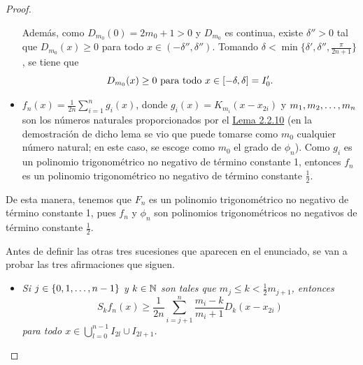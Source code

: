 \documentclass[a4paper, 12pt, oneside]{book}
\begin{document}
\begin{proof}
\begin{itemize}
        Además, como $D_{m_0}(0) = 2m_0+1 > 0$ y $D_{m_0}$ es continua, existe $\delta'' > 0$ tal que $D_{m_0}(x) \geq 0$ para todo $x \in (-\delta'',\delta'')$. Tomando $\delta < \min\{\delta',\delta'',\frac{\pi}{2n+1}\}$, se tiene que
        \begin{equation}\label{2.2.15}
            D_{m_0}(x) \geq 0 \textup{ para todo } x \in [-\delta,\delta] = I_0'.
        \end{equation}
        \item $f_n(x) = \frac{1}{2n}\sum_{i=1}^n g_i(x)$, donde $g_i(x)= K_{m_i}(x-x_{2i})$ y $m_1,m_2,\mathellipsis,m_n$ son los números naturales proporcionados por el \hyperref[2.2.10]{\color{blue}Lema 2.2.10} (en la demostración de dicho lema se vio que puede tomarse como $m_0$ cualquier número natural; en este caso, se escoge como $m_0$ el grado de $\phi_n$). Como $g_i$ es un polinomio trigonométrico no negativo de término constante 1, entonces $f_n$ es un polinomio trigonométrico no negativo de término constante $\frac{1}{2}$.
    \end{itemize}

    De esta manera, tenemos que $F_n$ es un polinomio trigonométrico no negativo de término constante 1, pues $f_n$ y $\phi_n$ son polinomios trigonométricos no negativos de término constante $\frac{1}{2}$.

    Antes de definir las otras tres sucesiones que aparecen en el enunciado, se van a probar las tres afirmaciones que siguen.

    \begin{itemize}
        \item \textit{Si $j \in \{0,1,\mathellipsis,n-1\}$ y $k \in \mathbb N$ son tales que $m_j \leq k < \frac{1}{2}m_{j+1}$, entonces
        \begin{equation}\label{2.2.16}
            S_kf_n(x) \geq \frac{1}{2n}\sum_{i=j+1}^n \frac{m_i-k}{m_i+1}D_k(x-x_{2i})
        \end{equation}
        para todo $x \in \bigcup_{l=0}^{n-1}I_{2l}\cup I_{2l+1}$.}


\end{itemize}
\end{proof}
\end{document}
